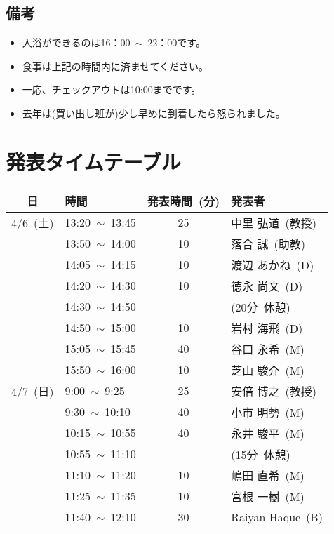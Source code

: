 \documentclass[unicode,a4paper,11pt]{ltjsarticle}
\begin{document}
\subsection*{備考}
\begin{itemize}
  \item
        入浴ができるのは16：00\ $\sim$\ 22：00です。
  \item 
        食事は上記の時間内に済ませてください。
  \item 
        一応、チェックアウトは10:00までです。
  \item
        去年は(買い出し班が)少し早めに到着したら怒られました。
\end{itemize}


\clearpage

\section{発表タイムテーブル}

\begin{center}
  \begin{tabular}{clcl}\hline
    日        & 時間                 & 発表時間\ (分) & 発表者            \\ \hline
    4/6\ (土) & 13:20\ $\sim$\ 13:45 & 25             & 中里 弘道\ (教授) \\
              & 13:50\ $\sim$\ 14:00 & 10             & 落合 誠\ (助教)   \\
              & 14:05\ $\sim$\ 14:15 & 10             & 渡辺 あかね\ (D)  \\
              & 14:20\ $\sim$\ 14:30 & 10             & 徳永 尚文\ (D)    \\
              & 14:30\ $\sim$\ 14:50 &                & (20分\ 休憩)      \\
              & 14:50\ $\sim$\ 15:00 & 10             & 岩村 海飛\ (D)    \\
              & 15:05\ $\sim$\ 15:45 & 40             & 谷口 永希\ (M)    \\
              & 15:50\ $\sim$\ 16:00 & 10             & 芝山 駿介\ (M)    \\\hline
    4/7\ (日) & 9:00\ $\sim$\ 9:25   & 25             & 安倍 博之\ (教授) \\
              & 9:30\ $\sim$\ 10:10  & 40             & 小市 明勢\ (M)    \\
              & 10:15\ $\sim$\ 10:55 & 40             & 永井 駿平\ (M)    \\
              & 10:55\ $\sim$\ 11:10 &                & (15分\ 休憩)      \\
              & 11:10\ $\sim$\ 11:20 & 10             & 嶋田 直希\ (M)    \\
              & 11:25\ $\sim$\ 11:35 & 10             & 宮根 一樹\ (M)    \\
              & 11:40\ $\sim$\ 12:10 & 30             & Raiyan Haque\ (B) \\
  \end{tabular}
\end{center}
\end{document}

